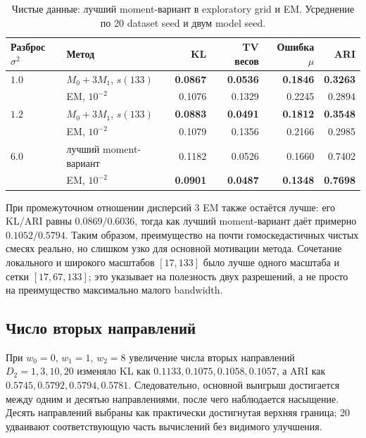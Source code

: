 \documentclass[11pt,a4paper]{article}
\newcommand{\best}[1]{\textbf{\color{green}#1}}
\newcommand{\Mzero}{M_0}
\newcommand{\Mone}{M_1}
\begin{document}
\begin{table}[ht]
\centering
\small
\caption{Чистые данные: лучший moment-вариант в exploratory grid и EM.
Усреднение по 20 dataset seed и двум model seed.}
\label{tab:clean-spread}
\begin{tabularx}{\linewidth}{@{}lYrrrr@{}}
\toprule
Разброс $\sigma^2$ & Метод & KL & TV весов & Ошибка $\mu$ & ARI \\
\midrule
$1.0$ & $\Mzero+3\Mone$, $s(133)$ & \best{0.0867} & \best{0.0536} & \best{0.1846} & \best{0.3263} \\
      & EM, $10^{-2}$                 & 0.1076 & 0.1329 & 0.2245 & 0.2894 \\
\addlinespace
$1.2$ & $\Mzero+3\Mone$, $s(133)$ & \best{0.0883} & \best{0.0491} & \best{0.1812} & \best{0.3548} \\
      & EM, $10^{-2}$                 & 0.1079 & 0.1356 & 0.2166 & 0.2985 \\
\addlinespace
$6.0$ & лучший moment-вариант          & 0.1182 & 0.0526 & 0.1660 & 0.7402 \\
      & EM, $10^{-2}$                 & \best{0.0901} & \best{0.0487} & \best{0.1348} & \best{0.7698} \\
\bottomrule
\end{tabularx}
\end{table}

При промежуточном отношении дисперсий $3$ EM также остаётся лучше: его
KL/ARI равны $0.0869/0.6036$, тогда как лучший moment-вариант даёт примерно
$0.1052/0.5794$. Таким образом, преимущество на почти гомоскедастичных
чистых смесях реально, но слишком узко для основной мотивации метода.
Сочетание локального и широкого масштабов $[17,133]$ было лучше одного
масштаба и сетки $[17,67,133]$; это указывает на полезность двух разрешений,
а не просто на преимущество максимально малого bandwidth.

\subsection{Число вторых направлений}

При $w_0=0$, $w_1=1$, $w_2=8$ увеличение числа вторых направлений
$D_2=1,3,10,20$ изменяло KL как
$0.1133,0.1075,0.1058,0.1057$, а ARI как
$0.5745,0.5792,0.5794,0.5781$. Следовательно, основной выигрыш достигается
между одним и десятью направлениями, после чего наблюдается насыщение.
Десять направлений выбраны как практически достигнутая верхняя граница;
20 удваивают соответствующую часть вычислений без видимого улучшения.
\end{document}
